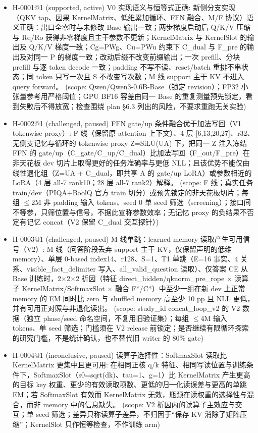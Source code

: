 \documentclass[11pt]{article}
\begin{document}
\begin{itemize}
\item H-0001@1 (supported, active) V0 实现语义与恒等式正确: 新侧分支实现（QKV tap、因果 KernelMatrix、低维累加循环、FFN 融合、M/F 协议）语义正确：出口全零时与未修改 Base 输出一致；两步梯度启动后 Q/K/V 压缩与 Rq/Ro 获得非零梯度且主干参数不更新；KernelMatrix 与 KernelSlot 的输出及 Q/K/V 梯度一致；Cg=PWg、Cu=PWu 约束下 C\_dual 与 F\_pre 的输出及对同一 P 的梯度一致；改动后缀不改变前缀输出；一次 prefill、分块 prefill 与逐 token decode 一致；padding 不写不读、reset/batch 重排不串状态；同 token 只写一次且 S 不改变写次数；M 线 support 主干 KV 不进入 query forward。 (scope: Qwen/Qwen3-0.6B-Base（锁定 revision）；FP32 小张量参考用严格阈值；GPU BF16 容差由同一 Base 的重复测量预先锁定，看到失败后不得放宽；检查围绕 plan §6.3 列出的风险，不要求重跑无关实验)
\item H-0002@1 (challenged, paused) FFN gate/up 条件融合优于加法写回（V1 tokenwise proxy）: F 线（保留原 attention 上下文）、4 层 [6,13,20,27]、r32、无侧支记忆与循环的 tokenwise proxy Z=SiLU(UA) 下，把同一 Z 注入冻结 FFN 的 gate/up（C\_gate/C\_up/C\_dual）比加法写回（F\_out/F\_pre）在非天花板 dev 切片上取得更好的任务准确率与更低 NLL；且该优势不能仅由线性退化组（Z=UA + C\_dual，即共享 A 的 gate/up LoRA）或参数相近的 LoRA（4 层 all-7 rank10；28 层 all-7 rank2）解释。 (scope: F 线；真实任务 train/dev（PIQA+BoolQ 官方 train 切分）或预先锁定的非天花板切片；每组 \ensuremath{\leq}2M 非 padding 输入 tokens、seed 0 单 seed 筛选（screening）；接口间不等参，只筛位置与信号，不据此宣称参数效率；无记忆 proxy 的负结果不否定有记忆 concat（V2 保留 C\_dual 交互探针）)
\item H-0003@1 (challenged, paused) M 线单跳：learned memory 读取产生可用信号（V2）: M 线（问答阶段丢弃 support 主干 KV，仅保留声明的低维 memory）、单层 0-based index14、r128、S=1、T1 单跳（E=16 事实、4 关系、visible\_fact\_delimiter 写入、all\_valid\_question 读取）、仅答案 CE 从 Base 训练时，2\ensuremath{\times}2\ensuremath{\times}2 析因（特征 direct\_hidden/qknorm\_pre\_rope \ensuremath{\times} 读算子 KernelMatrix/SoftmaxSlot \ensuremath{\times} 融合 F*/C*）中至少一组在新 dev 上正常 memory 的 EM 同时比 zero 与 shuffled memory 高至少 10 pp 且 NLL 更低，并有可用正对照与非退化读出。 (scope: study\_id concat\_loop\_v2 的 V2 数据（独立 phase/seed 命名空间，不复用旧验证集）；每组 \ensuremath{\leq}4M 输入 tokens、单 seed 筛选；门槛须在 V2 release 前锁定；是否继续有限循环探索的研究门槛，不是统计确认，也不替代旧 writer 的 80\% gate)
\item H-0004@1 (inconclusive, paused) 读算子选择性：SoftmaxSlot 读取比 KernelMatrix 更集中且更可用: 在相同正核 q/k 特征、相同写读位置与训练条件下，SoftmaxSlot（s0=sqrt(dk)、tau=1、g=1）比 KernelMatrix 产生更高的目标 key 权重、更少的有效读取项数、更低的归一化读误差与更高的单跳 EM；若 SoftmaxSlot 有效而 KernelMatrix 无效，瓶颈在读权重的选择性与混合，而非 memory 中的信息缺失。 (scope: V2 析因内的读算子主效应与交互；单 seed 筛选；差异只称读算子差异，不归因于``保存 KV 消除了矩阵压缩''；KernelSlot 只作恒等检查，不作训练 arm)

\end{itemize}
\end{document}
